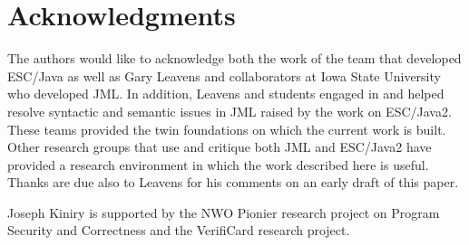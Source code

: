 \documentclass{llncs}
\begin{document}
\section{Acknowledgments}
The authors would like to acknowledge both the work of the team that
developed ESC/Java as well as Gary Leavens and collaborators at Iowa
State University who developed JML.  In addition, Leavens and students
engaged in and helped resolve syntactic and semantic issues in JML
raised by the work on ESC/Java2.  These teams provided the twin
foundations on which the current work is built.  Other research groups
that use and critique both JML and ESC/Java2 have provided a research
environment in which the work described here is useful.  Thanks are
due also to Leavens for his comments on an early draft of this paper.

Joseph Kiniry is supported by the NWO Pionier research project on
Program Security and Correctness and the VerifiCard research project.

%



%
%


\appendix
\end{document}
